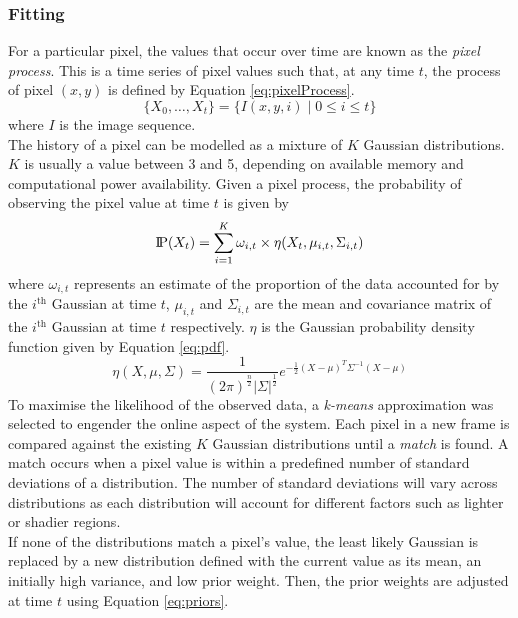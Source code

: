 \subsubsection{Fitting}
\setlength{\leftskip}{0.5cm}
\indent \indent
For a particular pixel, the values that occur over time are known as the \textit{pixel process}. This is a time series of pixel values such that, at any time $t$, the process of pixel $(x,y)$ is defined by Equation \ref{eq:pixelProcess}.
\begin{equation}
    \label{eq:pixelProcess}
    \{X_0, \ldots, X_t\} = \{I(x,y,i) \; | \; 0 \leq i \leq t\}
\end{equation}
where $I$ is the image sequence.
\smallskip \\ \indent
The history of a pixel can be modelled as a mixture of $K$ Gaussian distributions. $K$ is usually a value between 3 and 5, depending on available memory and computational power availability. Given a pixel process, the probability of observing the pixel value at time $t$ is given by
\begin{equation}
    \text{I\kern-0.15em P} (X_t) = \sum^K_{i=1} \omega_{i,t} \times \eta(X_t, \mu_{i,t}, \Sigma_{i,t})
\end{equation}
where $\omega_{i,t}$ represents an estimate of the proportion of the data accounted for by the $i^{\text{th}}$ Gaussian at time $t$, $\mu_{i,t}$ and $\Sigma_{i,t}$ are the mean and covariance matrix of the $i^{\text{th}}$ Gaussian at time $t$ respectively. $\eta$ is the Gaussian probability density function given by Equation \ref{eq:pdf}.
\begin{equation}
    \label{eq:pdf}
    \eta (X, \mu, \Sigma) = \frac{1}{(2\pi)^\frac{n}{2} |\Sigma|^\frac{1}{2}} e^{-\frac{1}{2} (X - \mu)^T \Sigma^{-1} (X - \mu)}
\end{equation}
\indent
To maximise the likelihood of the observed data, a \textit{k-means} approximation was selected to engender the online aspect of the system. Each pixel in a new frame is compared against the existing $K$ Gaussian distributions until a \textit{match} is found. A match occurs when a pixel value is within a predefined number of standard deviations of a distribution. The number of standard deviations will vary across distributions as each distribution will account for different factors such as lighter or shadier regions. 
\smallskip \\ \indent
If none of the distributions match a pixel's value, the least likely Gaussian is replaced by a new distribution defined with the current value as its mean, an initially high variance, and low prior weight. Then, the prior weights are adjusted at time $t$ using Equation \ref{eq:priors}.
